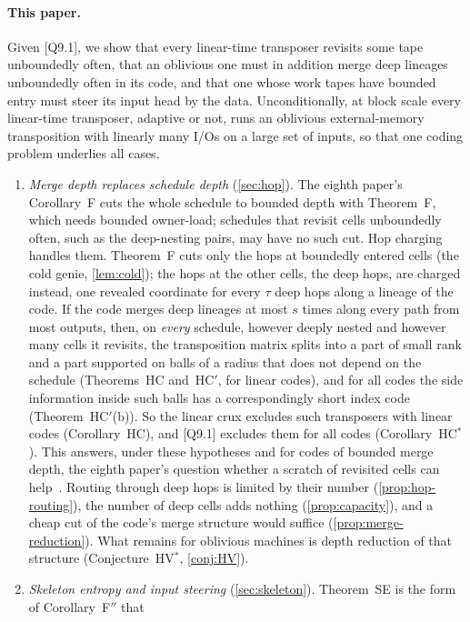 \paragraph{This paper.} Given [Q9.1], we show that every linear-time transposer revisits some tape unboundedly often,
that an oblivious one must in addition merge deep lineages unboundedly often in its code, and that one whose work tapes
have bounded entry must steer its input head by the data. Unconditionally, at block scale every linear-time transposer,
adaptive or not, runs an oblivious external-memory transposition with linearly many I/Os on a large set of inputs, so
that one coding problem underlies all cases.
\begin{enumerate}
\item \emph{Merge depth replaces schedule depth} (\cref{sec:hop}). The eighth paper's Corollary~F cuts the whole schedule
to bounded depth with Theorem~F, which needs bounded owner-load; schedules that revisit cells unboundedly often, such as
the deep-nesting pairs, may have no such cut. Hop charging handles them. Theorem~F cuts only the hops at boundedly entered
cells (the cold genie, \cref{lem:cold}); the hops at the other cells, the deep hops, are charged instead, one revealed
coordinate for every $\tau$ deep hops along a lineage of the code. If the code merges deep lineages at most $s$ times
along every path from most outputs, then, on \emph{every} schedule, however deeply nested and however many cells it
revisits, the transposition matrix splits into a part of small rank and a part supported on balls of a radius that does
not depend on the schedule (Theorems~HC and~HC$'$, for linear codes), and for all codes the side information inside
such balls has a correspondingly short index code (Theorem~HC$'$(b)). So the linear crux excludes such transposers with
linear codes (Corollary~HC), and [Q9.1] excludes them for all codes (Corollary~HC$^*$). This answers, under these
hypotheses and for codes of bounded merge depth, the eighth paper's question whether a scratch of revisited cells can
help~\cite[Problem~10.5]{BoundedNesting2026}. Routing through deep hops is limited by their number
(\cref{prop:hop-routing}), the number of deep cells adds nothing (\cref{prop:capacity}), and a cheap cut of the code's
merge structure would suffice (\cref{prop:merge-reduction}). What remains for oblivious machines is depth reduction of
that structure (Conjecture~HV$^*$, \cref{conj:HV}).
\item \emph{Skeleton entropy and input steering} (\cref{sec:skeleton}). Theorem~SE is the form of Corollary~F$''$ that

\end{enumerate}
